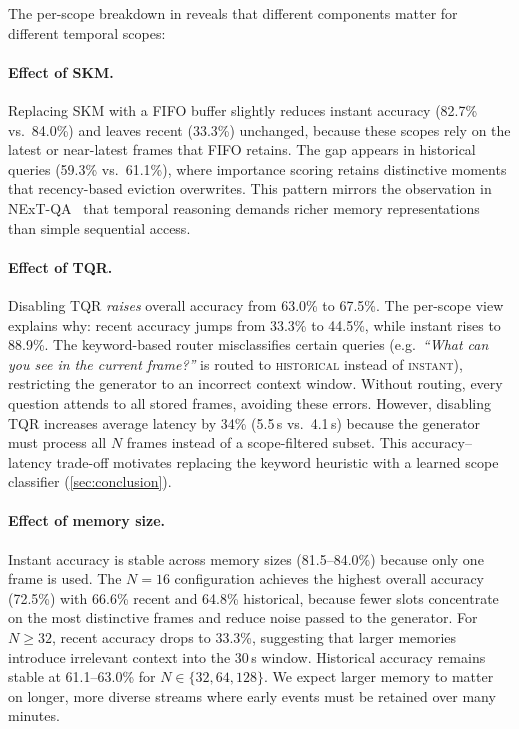 The per-scope breakdown in  reveals that different components matter for different temporal scopes:

\paragraph{Effect of SKM.}
Replacing SKM with a FIFO buffer slightly reduces instant accuracy (82.7\% vs.\ 84.0\%) and leaves recent (33.3\%) unchanged, because these scopes rely on the latest or near-latest frames that FIFO retains.
The gap appears in historical queries (59.3\% vs.\ 61.1\%), where importance scoring retains distinctive moments that recency-based eviction overwrites.
This pattern mirrors the observation in NExT-QA~\cite{xiao2021nextqa} that temporal reasoning demands richer memory representations than simple sequential access.

\paragraph{Effect of TQR.}
Disabling TQR \emph{raises} overall accuracy from 63.0\% to 67.5\%.
The per-scope view explains why: recent accuracy jumps from 33.3\% to 44.5\%, while instant rises to 88.9\%.
The keyword-based router misclassifies certain queries (e.g.\ \emph{``What can you see in the current frame?''} is routed to \textsc{historical} instead of \textsc{instant}), restricting the generator to an incorrect context window.
Without routing, every question attends to all stored frames, avoiding these errors.
However, disabling TQR increases average latency by 34\% (5.5\,s vs.\ 4.1\,s) because the generator must process all $N$ frames instead of a scope-filtered subset.
This accuracy--latency trade-off motivates replacing the keyword heuristic with a learned scope classifier (\cref{sec:conclusion}).

\paragraph{Effect of memory size.}
Instant accuracy is stable across memory sizes (81.5--84.0\%) because only one frame is used.
The $N\!=\!16$ configuration achieves the highest overall accuracy (72.5\%) with 66.6\% recent and 64.8\% historical, because fewer slots concentrate on the most distinctive frames and reduce noise passed to the generator.
For $N \ge 32$, recent accuracy drops to 33.3\%, suggesting that larger memories introduce irrelevant context into the 30\,s window.
Historical accuracy remains stable at 61.1--63.0\% for $N \in \{32, 64, 128\}$.
We expect larger memory to matter on longer, more diverse streams where early events must be retained over many minutes.



